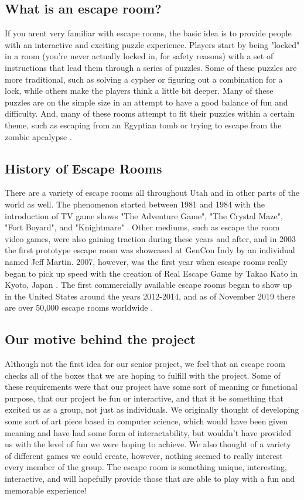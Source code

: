 \documentclass[conference]{IEEEtran}
\begin{document}
\subsection*{What is an escape room?}
If you arent very familiar with escape rooms, the basic idea is to provide people with an interactive
and exciting puzzle experience. Players start by being "locked" in a room (you're never actually locked
in, for safety reasons) with a set of instructions that lead them through a series of puzzles. Some of
these puzzles are more traditional, such as solving a cypher or figuring out a combination for a lock,
while others make the players think a little bit deeper. Many of these puzzles are on the simple size in
an attempt to have a good balance of fun and difficulty. And, many of these rooms attempt to fit their
puzzles within a certain theme, such as escaping from an Egyptian tomb or trying to escape from the zombie
apcalypse \cite{wikipediaEscapeRoom}.

\subsection*{History of Escape Rooms}
There are a variety of escape rooms all throughout Utah and in other parts of the world as well. The phenomenon
started between 1981 and 1984 with the introduction of TV game shows "The Adventure Game", "The Crystal Maze",
"Fort Boyard", and "Knightmare" \cite{wikipediaEscapeRoom}. Other mediums, such as escape the room video games, were also gaining traction
during these years and after, and in 2003 the first prototype escape room was showcased at GenCon Indy by
an individual named Jeff Martin. 2007, however, was the first year when escape rooms really began to pick up speed
with the creation of Real Escape Game by Takao Kato in Kyoto, Japan \cite{whatIsAnEscapeRoom}. The first commercially available escape rooms
began to show up in the United States around the years 2012-2014, and as of November 2019 there are over 50,000 escape
rooms worldwide \cite{wikipediaEscapeRoom}.

\subsection*{Our motive behind the project}
Although not the first idea for our senior project, we feel that an escape room checks all of the
boxes that we are hoping to fulfill with the project. Some of these requirements were that our project
have some sort of meaning or functional purpose, that our project be fun or interactive, and that
it be something that excited us as a group, not just as individuals. We originally thought of developing some
sort of art piece based in computer science, which would have been given meaning and have had some form of
interactability, but wouldn't have provided us with the level of fun we were hoping to achieve.
We also thought of a variety of different games we could create, however, nothing seemed to really interest
every member of the group. The escape room is something unique, interesting, interactive, and will hopefully
provide those that are able to play with a fun and memorable experience!
\end{document}
